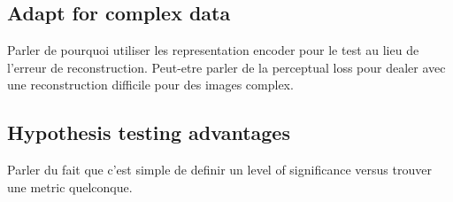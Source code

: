 \subsection{Adapt for complex data}

Parler de pourquoi utiliser les representation encoder pour le test au lieu de l'erreur de reconstruction. Peut-etre parler de la perceptual loss pour dealer avec une reconstruction difficile pour des images complex.

\subsection{Hypothesis testing advantages}

Parler du fait que c'est simple de definir un level of significance versus trouver une metric quelconque.